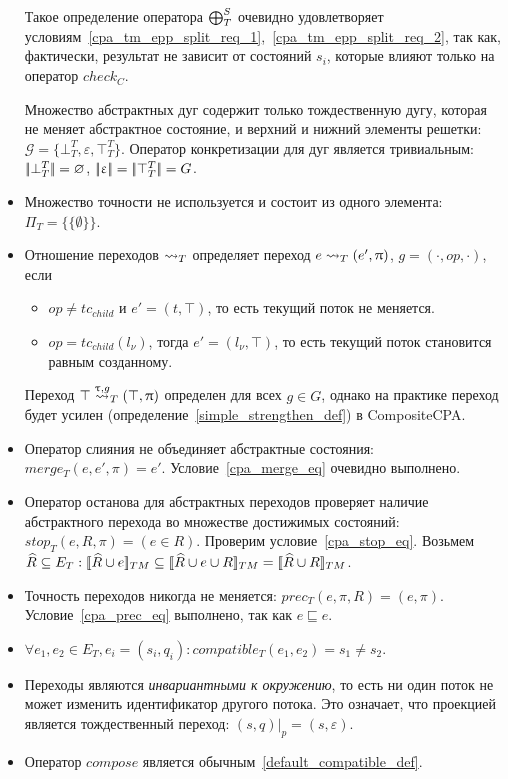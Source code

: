 \begin{itemize}
Такое определение оператора $\mathrel{\bigoplus}^S_T$ очевидно удовлетворяет условиям~\ref{cpa_tm_epp_split_req_1},~\ref{cpa_tm_epp_split_req_2}, так как, фактически, результат не зависит от состояний $s_i$, которые влияют только на оператор $check_C$.

Множество абстрактных дуг содержит только тождественную дугу, которая не меняет абстрактное состояние, и верхний и нижний элементы решетки: $\mathcal{G} = \{\bot^T_T, \varepsilon, \top^T_T\}$.
Оператор конкретизации для дуг является тривиальным: $\lvert \! \lvert \bot^T_T \rvert \! \rvert = \varnothing$, $\lvert \! \lvert \upvarepsilon \rvert \! \rvert = \lvert \! \lvert \top^T_T \rvert \! \rvert = G$.

\item Множество точности не используется и состоит из одного элемента: $\Pi_T = \{\{\emptyset\}\}$.

\item Отношение переходов $\leadsto_T$ определяет переход $e \leadsto_T (e', \uppi)$, $g=(\cdot,op,\cdot)$, если 
\begin{itemize}
\item $op\neq tc_{child}$ и $e' = (t, \top)$, то есть текущий поток не меняется.
\item $op=tc_{child}(l_\nu)$, тогда $e' = (l_\nu, \top)$, то есть текущий поток становится равным созданному.
\end{itemize}

Переход $\top \stackrel{\uptau, g}{\leadsto}_T (\top, \uppi)$ определен для всех $g\in G$, однако на практике переход будет усилен (определение~\ref{simple_strengthen_def}) в CompositeCPA.

\item Оператор слияния не объединяет абстрактные состояния: $merge_T(e, e', \pi) = e'$. Условие~\ref{cpa_merge_eq} очевидно выполнено.

\item Оператор останова для абстрактных переходов проверяет наличие абстрактного перехода во множестве достижимых состояний: $stop_T(e, R, \pi) = (e \in R)$.
Проверим условие~\ref{cpa_stop_eq}.
Возьмем $\widehat{R} \subseteq E_T: [\![ \widehat{R} \cup e ]\!]_{TM} \subseteq [\![ \widehat{R} \cup e \cup R ]\!]_{TM} = [\![ \widehat{R} \cup R ]\!]_{TM}$.

\item Точность переходов никогда не меняется: $prec_T(e, \pi, R) = (e, \pi)$. Условие~\ref{cpa_prec_eq} выполнено, так как $e \sqsubseteq e$.

\item $\forall e_1, e_2 \in E_T, e_i = (s_i, q_i):compatible_T(e_1,e_2) = s_1 \neq s_2$.

\item Переходы являются {\em инвариантными к окружению}, то есть ни один поток не может изменить идентификатор другого потока.
Это означает, что проекцией является тождественный переход:
$(s, q)|_p = (s, \varepsilon)$.

\item Оператор $compose$ является обычным~\ref{default_compatible_def}.
\end{itemize}

